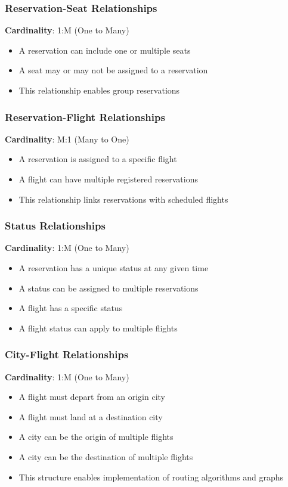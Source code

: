 \documentclass[conference]{IEEEtran}
\begin{document}
    \subsubsection{Reservation-Seat Relationships}
    \textbf{Cardinality}: 1:M (One to Many)
    \begin{itemize}
        \item A reservation can include one or multiple seats
        \item A seat may or may not be assigned to a reservation
        \item This relationship enables group reservations
    \end{itemize}

    \subsubsection{Reservation-Flight Relationships}
    \textbf{Cardinality}: M:1 (Many to One)
    \begin{itemize}
        \item A reservation is assigned to a specific flight
        \item A flight can have multiple registered reservations
        \item This relationship links reservations with scheduled flights
    \end{itemize}

    \subsubsection{Status Relationships}
    \textbf{Cardinality}: 1:M (One to Many)
    \begin{itemize}
        \item A reservation has a unique status at any given time
        \item A status can be assigned to multiple reservations
        \item A flight has a specific status
        \item A flight status can apply to multiple flights
    \end{itemize}

    \subsubsection{City-Flight Relationships}
    \textbf{Cardinality}: 1:M (One to Many)
    \begin{itemize}
        \item A flight must depart from an origin city
        \item A flight must land at a destination city
        \item A city can be the origin of multiple flights
        \item A city can be the destination of multiple flights
        \item This structure enables implementation of routing algorithms and graphs
    \end{itemize}
\end{document}
